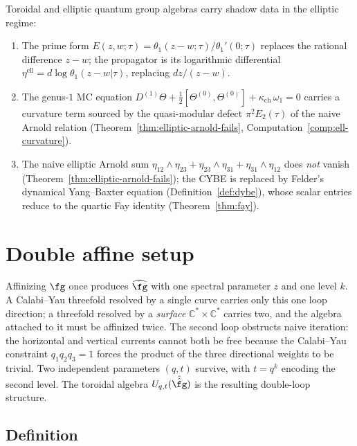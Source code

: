 \begin{construction}
\label{constr:elliptic-shadow-data}
Toroidal and elliptic quantum group algebras carry shadow data in the elliptic regime:
\begin{enumerate}[label=\textup{(\roman*)}]
\item The prime form $E(z,w;\tau) = \theta_1(z-w;\tau)/\theta_1'(0;\tau)$ replaces the rational difference $z-w$; the propagator is its logarithmic differential $\eta^{\mathrm{ell}} = d\log\theta_1(z-w|\tau)$, replacing $dz/(z-w)$.
\item The genus-$1$ MC equation $D^{(1)}\Theta + \tfrac{1}{2}[\Theta^{(0)}, \Theta^{(0)}] + \kappa_{\mathrm{ch}}\,\omega_1 = 0$ carries a curvature term sourced by the quasi-modular defect $\pi^2 E_2(\tau)$ of the naive Arnold relation (Theorem~\ref{thm:elliptic-arnold-fails}, Computation~\ref{comp:ell-curvature}).
\item The naive elliptic Arnold sum $\eta_{12}\wedge\eta_{23} + \eta_{23}\wedge\eta_{31} + \eta_{31}\wedge\eta_{12}$ does \emph{not} vanish (Theorem~\ref{thm:elliptic-arnold-fails}); the CYBE is replaced by Felder's dynamical Yang--Baxter equation (Definition~\ref{def:dybe}), whose scalar entries reduce to the quartic Fay identity (Theorem~\ref{thm:fay}).
\end{enumerate}
\end{construction}

\section{Double affine setup}
\label{sec:double-affine}

Affinizing $\fg$ once produces $\widehat{\fg}$ with one spectral parameter $z$
and one level $k$. A Calabi--Yau threefold resolved by a single curve carries
only this one loop direction; a threefold resolved by a \emph{surface}
$\mathbb{C}^* \times \mathbb{C}^*$ carries two, and the algebra attached to
it must be affinized twice. The second loop obstructs naive iteration: the
horizontal and vertical currents cannot both be free because the
Calabi--Yau constraint $q_1 q_2 q_3 = 1$ forces the product of the three
directional weights to be trivial. Two independent parameters $(q,t)$
survive, with $t = q^k$ encoding the second level. The toroidal algebra
$U_{q,t}(\hat{\hat{\fg}})$ is the resulting double-loop structure.

\subsection{Definition}

